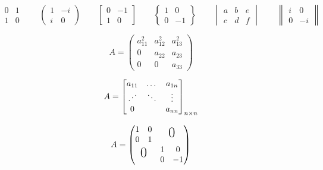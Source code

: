 \documentclass{ctexart}
\newcommand{\adots}{\mathinner{\mkern2mu\raisebox{0.1em}{.}\mkern2mu\raisebox{0.4em}{.}\mkern2mu\raisebox{0.7em}{.}\mkern1mu}}
\begin{document}
	\[  %
	\begin{matrix}  %
		0 & 1 \\   %
		1 & 0
	\end{matrix} \qquad
	\begin{pmatrix}  %
		1 & -i \\
		i & 0
	\end{pmatrix} \qquad
	\begin{bmatrix}  %
		0 & -1 \\
		1 & 0
	\end{bmatrix} \qquad
	\begin{Bmatrix}  %
		1 & 0 \\
		0 & -1
	\end{Bmatrix} \qquad
	\begin{vmatrix}  %
		a & b & e \\
		c & d & f
	\end{vmatrix} \qquad
	\begin{Vmatrix}  %
		i & 0 \\
		0 & -i 
	\end{Vmatrix} \qquad
	\]
	
	\[
		A = \begin{pmatrix} %
			a_{11} ^ 2 & a_{12} ^ 2 & a_{13} ^ 2 \\
			0 & a_{22} & a_{23} \\
			0 & 0 & a_{33}
			\end{pmatrix}
	\]
	
	\[
		A = \begin{bmatrix}
			a_{11} & \dots & a_{1n} \\ %
			\adots & \ddots & \vdots \\ %
			0 &  & a_{nn}
			\end{bmatrix}_{n \times n} %
	\]
	
	\[
		A = \begin{pmatrix}
			\begin{matrix}
				1 & 0 \\
				0 & 1
			\end{matrix} & \text{\LARGE 0} \\
			\text{\LARGE 0} & \begin{matrix}
				1 & 0 \\
				0 & -1
			\end{matrix}
		\end{pmatrix}
	\]
	
\end{document}
